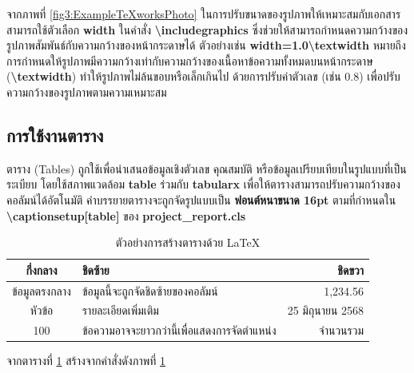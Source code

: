 \hspace*{1.5em} %
จากภาพที่ \ref{fig3:ExampleTeXworksPhoto} ในการปรับขนาดของรูปภาพให้เหมาะสมกับเอกสาร สามารถใช้ตัวเลือก \textbf{width} ในคำสั่ง \textbf{\textbackslash includegraphics} ซึ่งช่วยให้สามารถกำหนดความกว้างของรูปภาพสัมพันธ์กับความกว้างของหน้ากระดาษได้ ตัวอย่างเช่น \textbf{width=1.0\textbackslash textwidth} หมายถึง การกำหนดให้รูปภาพมีความกว้างเท่ากับความกว้างของเนื้อหาข้อความทั้งหมดบนหน้ากระดาษ (\textbf{\textbackslash textwidth}) ทำให้รูปภาพไม่ล้นขอบหรือเล็กเกินไป ด้วยการปรับค่าตัวเลข (เช่น 0.8) เพื่อปรับความกว้างของรูปภาพตามความเหมาะสม

\subsection{การใช้งานตาราง}
\hspace*{1.5em} %
ตาราง (Tables) ถูกใช้เพื่อนำเสนอข้อมูลเชิงตัวเลข คุณสมบัติ หรือข้อมูลเปรียบเทียบในรูปแบบที่เป็นระเบียบ โดยใช้สภาพแวดล้อม \textbf{table} ร่วมกับ \textbf{tabularx} เพื่อให้ตารางสามารถปรับความกว้างของคอลัมน์ได้อัตโนมัติ คำบรรยายตารางจะถูกจัดรูปแบบเป็น \textbf{ฟอนต์หนาขนาด 16pt} ตามที่กำหนดใน \textbf{\textbackslash captionsetup[table]} ของ \textbf{project\_report.cls}


\newpage
\begin{table}[h!]
    \centering
    \caption{\fontSixTeen ตัวอย่างการสร้างตารางด้วย LaTeX}
    \label{tab3:ExampleCreateTable}
    \fontSixTeen 
    \begin{tabularx}{\textwidth}{| c | X | r |} 
    \hline
    \textbf{กึ่งกลาง} 	& \textbf{ชิดซ้าย} 					& \textbf{ชิดขวา} \\
    \hline
    ข้อมูลตรงกลาง      & ข้อมูลนี้จะถูกจัดชิดซ้ายของคอลัมน์			& 1,234.56 		 \\
    หัวข้อ            & รายละเอียดเพิ่มเติม                     & 25 มิถุนายน 2568 \\
    100            	& ข้อความอาจจะยาวกว่านี้เพื่อแสดงการจัดตำแหน่ง & จำนวนรวม 		 \\
    \hline
    \end{tabularx}
\end{table}

\hspace*{1.5em} %
จากตารางที่ \ref{tab3:ExampleCreateTable} สร้างจากคำสั่งดังภาพที่ \ref{fig3:ExampleCreateTable} 

\begin{figure}[h!]
\centering
{}
\caption{}
\label{fig3:ExampleCreateTable}
\end{figure}


